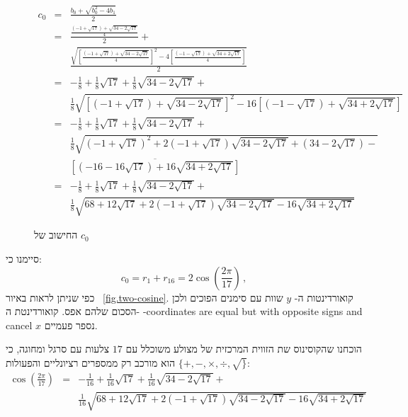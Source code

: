 \documentclass[11pt,a4paper]{article}
\newenvironment{form}[1]{%
\begin{displaymath}%
\renewcommand{\arraystretch}{#1}%
\begin{array}{lcl}}%
{\end{array}%
\end{displaymath}%
}
\newcommand*{\disfrac}[2]{\displaystyle\frac{#1}{#2}}
\begin{document}
\begin{figure}
\begin{form}{2.8}
c_0&=&\disfrac{b_0+\sqrt{b_0^2-4b_1}}{2}\\
&=&\disfrac{
     \disfrac{
     (-1+\sqrt{17}) + 
     \sqrt{34-2\sqrt{17}}
   }{4}}{2} + \\
&& 
    \disfrac{
       \sqrt{\left[\disfrac{
     (-1+\sqrt{17}) + 
     \sqrt{34-2\sqrt{17}}
   }{4}\right]^2-4\left[\disfrac{
     (-1-\sqrt{17}) + 
     \sqrt{34+2\sqrt{17}}
   }{4}\right]}
   }{2}\\
&=&-\disfrac{1}{8}+\disfrac{1}{8}\sqrt{17} + 
     \disfrac{1}{8}\sqrt{34-2\sqrt{17}}
    + \\
   &&
     \disfrac{1}{8}\sqrt{
     \left[
     (-1+\sqrt{17}) + 
     \sqrt{34-2\sqrt{17}}
   \right]^2-16\left[
     (-1-\sqrt{17}) + 
     \sqrt{34+2\sqrt{17}}
   \right]}
\\
&=&-\disfrac{1}{8}+\disfrac{1}{8}\sqrt{17} + 
     \disfrac{1}{8}\sqrt{34-2\sqrt{17}}
    + \\
   &&
     \disfrac{1}{8}\sqrt{
     (-1+\sqrt{17})^2 + 
     2(-1+\sqrt{17})\sqrt{34-2\sqrt{17}}+
     (34-2\sqrt{17})
   -}\\
   &&\overline{
     \left[(-16-16\sqrt{17}) + 
     16\sqrt{34+2\sqrt{17}}\right]
   }
\\
&=&-\disfrac{1}{8}+\disfrac{1}{8}\sqrt{17} + 
     \disfrac{1}{8}\sqrt{34-2\sqrt{17}}
    + \\
   &&
     \disfrac{1}{8}\sqrt{
     68+12\sqrt{17} + 
     2(-1+\sqrt{17})\sqrt{34-2\sqrt{17}}
   -16
     \sqrt{34+2\sqrt{17}}
   }

\end{form}
\caption{החישוב של $c_0$}\label{fig.c0}
\end{figure}

סיימנו כי:
\[
c_0=r_1+r_{16}=2\cos\left(\frac{2\pi}{17}\right)\,,
\]
כפי שניתן לראות באיור%
~\ref{fig.two-cosine}.
קואורדינטות ה-%
$y$
שוות עם סימנים הפוכים ולכן הסכום שלהם אפס. קואורדינטת ה-%
-coordinates are equal but with opposite signs and cancel $x$
נספר פעמיים.

הוכחנו שהקוסינוס שת הזווית המרכזית של מצולע משוכלל עם 
$17$
צלעות עם סרגל ומחוגה, כי הוא מורכב רק ממספרים רציונליים והפעולות 
$\{+,-,\times,\div,\surd\}$:
\begin{form}{2.2}
\cos\left(\disfrac{2\pi}{17}\right) &=& 
-\disfrac{1}{16}+\disfrac{1}{16}\sqrt{17} + 
     \disfrac{1}{16}\sqrt{34-2\sqrt{17}}
    + \\
    &&
     \disfrac{1}{16}\sqrt{
     68+12\sqrt{17} + 
     2(-1+\sqrt{17})\sqrt{34-2\sqrt{17}}
   -16
     \sqrt{34+2\sqrt{17}}
   }
\end{form}
\end{document}
